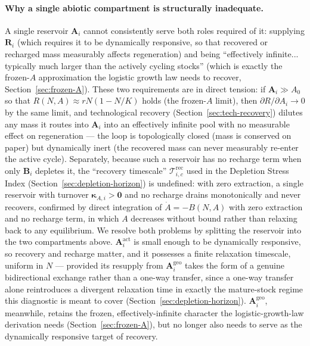 \documentclass[twocolumn,10pt]{article}
\begin{document}
\paragraph{Why a single abiotic compartment is structurally inadequate.} A single reservoir $\mathbf A_i$ cannot consistently serve both roles required of it: supplying $\mathbf R_i$ (which requires it to be dynamically responsive, so that recovered or recharged mass measurably affects regeneration) and being ``effectively infinite... typically much larger than the actively cycling stocks'' (which is exactly the frozen-$A$ approximation the logistic growth law needs to recover, Section~\ref{sec:frozen-A}). These two requirements are in direct tension: if $\mathbf A_i\gg A_0$ so that $R(N,A)\approx rN(1-N/K)$ holds (the frozen-$A$ limit), then $\partial R/\partial A_i\to0$ by the same limit, and technological recovery (Section~\ref{sec:tech-recovery}) dilutes any mass it routes into $\mathbf A_i$ into an effectively infinite pool with no measurable effect on regeneration — the loop is topologically closed (mass is conserved on paper) but dynamically inert (the recovered mass can never measurably re-enter the active cycle). Separately, because such a reservoir has no recharge term when only $\mathbf B_i$ depletes it, the ``recovery timescale'' $\mathcal T^{\text{rec}}_{i,c}$ used in the Depletion Stress Index (Section~\ref{sec:depletion-horizon}) is undefined: with zero extraction, a single reservoir with turnover $\boldsymbol\kappa_{A,i}>\mathbf 0$ and no recharge drains monotonically and never recovers, confirmed by direct integration of $\dot A=-B(N,A)$ with zero extraction and no recharge term, in which $A$ decreases without bound rather than relaxing back to any equilibrium. We resolve both problems by splitting the reservoir into the two compartments above. $\mathbf A^{\text{act}}_i$ is small enough to be dynamically responsive, so recovery and recharge matter, and it possesses a finite relaxation timescale, uniform in $N$ — provided its resupply from $\mathbf A^{\text{geo}}_i$ takes the form of a genuine bidirectional exchange rather than a one-way transfer, since a one-way transfer alone reintroduces a divergent relaxation time in exactly the mature-stock regime this diagnostic is meant to cover (Section~\ref{sec:depletion-horizon}). $\mathbf A^{\text{geo}}_i$, meanwhile, retains the frozen, effectively-infinite character the logistic-growth-law derivation needs (Section~\ref{sec:frozen-A}), but no longer also needs to serve as the dynamically responsive target of recovery.
\end{document}

